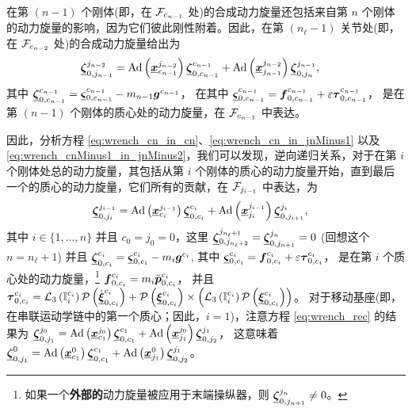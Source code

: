 在第 $\left(n-1\right)$ 个刚体(即，在 $\mathcal{F}_{c_{n-1}}$ 处)的合成动力旋量还包括来自第 $n$ 个刚体的动力旋量的影响，因为它们彼此刚性附着。因此，在第 $\left(n_{\ell}-1\right)$ 关节处(即，在 $\mathcal{F}_{c_{n-2}}$ 处)的合成动力旋量给出为
\begin{alignat}{1}
\underline{\boldsymbol{\zeta}}_{0,j_{n-1}}^{j_{n-2}} & =\mathrm{Ad}\left(\underline{\boldsymbol{x}}_{c_{n-1}}^{j_{n-2}}\right)\underline{\boldsymbol{\zeta}}_{0,c_{n-1}}^{c_{n-1}}+\mathrm{Ad}\left(\underline{\boldsymbol{x}}_{j_{n-1}}^{j_{n-2}}\right)\underline{\boldsymbol{\zeta}}_{0,j_{n}}^{j_{n-1}},\label{eq:wrench_cnMinus1_in_jnMinus2}
\end{alignat}
其中 $\underline{\boldsymbol{\zeta}}_{0,c_{n-1}}^{c_{n-1}}=\underline{\boldsymbol{\varsigma}}_{0,c_{n-1}}^{c_{n-1}}-m_{n-1}\boldsymbol{g}^{c_{n-1}}$，
在其中 $\underline{\boldsymbol{\varsigma}}_{0,c_{n-1}}^{c_{n-1}}=\boldsymbol{f}_{0,c_{n-1}}^{c_{n-1}}+\varepsilon\boldsymbol{\tau}_{0,c_{n-1}}^{c_{n-1}}$，
是在第 $\left(n-1\right)$ 个刚体的质心处的动力旋量，在 $\mathcal{F}_{c_{n-1}}$ 中表达。

因此，分析方程 \eqref{eq:wrench_cn_in_cn}、\eqref{eq:wrench_cn_in_jnMinus1} 以及 \eqref{eq:wrench_cnMinus1_in_jnMinus2}，我们可以发现，逆向递归关系，对于在第 $i$ 个刚体处总的动力旋量，其包括从第 $i$ 个刚体的质心的动力旋量开始，直到最后一个的质心的动力旋量，它们所有的贡献，在 $\mathcal{F}_{j_{i-1}}$ 中表达，为
\begin{align}
\underline{\boldsymbol{\zeta}}_{0,j_{i}}^{j_{i-1}} & =\mathrm{Ad}\left(\underline{\boldsymbol{x}}_{c_{i}}^{j_{i-1}}\right)\underline{\boldsymbol{\zeta}}_{0,c_{i}}^{c_{i}}+\mathrm{Ad}\left(\underline{\boldsymbol{x}}_{j_{i}}^{j_{i-1}}\right)\underline{\boldsymbol{\zeta}}_{0,j_{i+1}}^{j_{i}},\label{eq:wrench_rec}
\end{align}
其中 $i\in\{1,\ldots,n\}$ 并且 $c_{0}=j_{0}=0$，这里 $\underline{\boldsymbol{\zeta}}_{0,j_{n_{\ell}+2}}^{j_{n_{\ell}+1}}=\underline{\boldsymbol{\zeta}}_{0,j_{n+1}}^{j_{n}}=0$
(回想这个 $n=n_{\ell}+1$) 并且 $\underline{\boldsymbol{\zeta}}_{0,c_{i}}^{c_{i}}=\underline{\boldsymbol{\varsigma}}_{0,c_{i}}^{c_{i}}-m_{i}\boldsymbol{g}^{c_{i}}$,
其中 $\underline{\boldsymbol{\varsigma}}_{0,c_{i}}^{c_{i}}=\boldsymbol{f}_{0,c_{i}}^{c_{i}}+\varepsilon\boldsymbol{\tau}_{0,c_{i}}^{c_{i}}$，
是在第 $i$ 个质心处的动力旋量，\footnote{如果一个\textbf{外部的}动力旋量被应用于末端操纵器，则 $\underline{\boldsymbol{\zeta}}_{0,j_{n+1}}^{j_{n}}\neq0$。} $\boldsymbol{f}_{0,c_{i}}^{c_{i}}=m_{i}\ddot{\boldsymbol{p}}_{0,c_{i}}^{c_{i}}$，
并且 $\boldsymbol{\tau}_{0,c_{i}}^{c_{i}}=\mathcal{L}_{3}\left(\boldsymbol{\mathbb{I}}_{i}^{c_{i}}\right)\operatorname{\mathcal{P}}\left(\dot{\underline{\boldsymbol{\xi}}}_{0,c_{i}}^{c_{i}}\right)+\operatorname{\mathcal{P}}\left(\underline{\boldsymbol{\xi}}_{0,c_{i}}^{c_{i}}\right)\times\left(\mathcal{L}_{3}\left(\boldsymbol{\mathbb{I}}_{i}^{c_{i}}\right)\operatorname{\mathcal{P}}\left(\underline{\boldsymbol{\xi}}_{0,c_{i}}^{c_{i}}\right)\right)$。
对于移动基座(即，在串联运动学链中的第一个质心；因此，$i=1$)，注意方程 \eqref{eq:wrench_rec} 的结果为 $\underline{\boldsymbol{\zeta}}_{0,j_{1}}^{j_{0}}=\mathrm{Ad}\left(\underline{\boldsymbol{x}}_{c_{1}}^{j_{0}}\right)\underline{\boldsymbol{\zeta}}_{0,c_{1}}^{c_{1}}+\mathrm{Ad}\left(\underline{\boldsymbol{x}}_{j_{1}}^{j_{0}}\right)\underline{\boldsymbol{\zeta}}_{0,j_{2}}^{j_{1}}$，
这意味着 $\underline{\boldsymbol{\zeta}}_{0,j_{1}}^{0}=\mathrm{Ad}\left(\underline{\boldsymbol{x}}_{c_{1}}^{0}\right)\underline{\boldsymbol{\zeta}}_{0,c_{1}}^{c_{1}}+\mathrm{Ad}\left(\underline{\boldsymbol{x}}_{j_{1}}^{0}\right)\underline{\boldsymbol{\zeta}}_{0,j_{2}}^{j_{1}}$。

